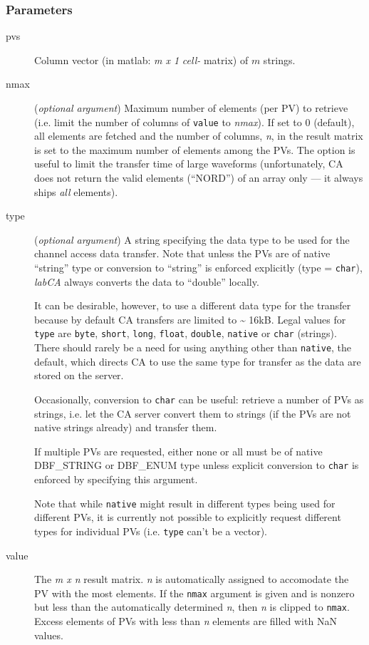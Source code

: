 \documentclass{article}
\newcommand{\sca}{\ita{labCA}}
\newcommand{\com}[1]{{\tt #1}}
\newcommand{\NAN}{\mbox{NaN}}
\newcommand{\ita}[1]{\emph{#1}}
\newcommand{\m}{$m$}
\newcommand{\mhack}{$m$} %
\newcommand{\n}{$n$}
\newcommand{\mxn}{$m\times n$}
\newcommand{\mxl}{$m\times 1$}
\newcommand{\calimit}{$\approx 16$kB}
\renewcommand{\m}{\ita{m}}
\newcommand{\mhack}{\ita{m}} %
\renewcommand{\n}{\ita{n}}
\renewcommand{\mxn}{\ita{m x n}}
\renewcommand{\mxl}{\ita{m x 1}}
\renewcommand{\calimit}{\~{} 16kB}
\newcommand{\PVITEM}{
\item[pvs] Column vector (in matlab: \mxl{} \ita{cell-} matrix)
of \mhack{} strings.
}
\begin{document}
\subsubsection{Parameters}
\begin{description}
\PVITEM
%
%
\item[nmax] \label{nmaxarg}
(\ita{optional argument}) Maximum number of elements
(per PV) to retrieve (i.e. limit the number of columns of \com{value} to
\ita{nmax}).
If set to 0 (default), all elements are fetched
and the number of columns, \n, in the result matrix is set to the
maximum number of elements among the PVs. The option is useful
to limit the transfer time of large waveforms (unfortunately,
CA does not return the valid elements (``NORD'') of
an array only --- it always ships \ita{all} elements).
%
%
\item[type] \label{typearg}
(\ita{optional argument}) A string specifying the
data type to be used for the channel access data transfer. Note
that unless the PVs are of native ``string'' type or conversion to
``string'' is enforced explicitly (type = \com{char}), \sca{}
always converts the data to ``double'' locally.

It can be desirable, however, to use a different data type for the
transfer because by default CA transfers are limited to \calimit.
Legal values for \com{type}{} are \com{byte}, \com{short}, \com{long},
\com{float}, \com{double}, \com{native} or \com{char} (strings).
There should rarely be a need for using anything other than \com{native},
the default, which directs CA to use the same type for transfer as the
data are stored on the server.

Occasionally, conversion to \com{char} can be useful: retrieve a number
of PVs as strings, i.e. let the CA server convert them to strings
(if the PVs are not native strings already) and transfer them.

If multiple PVs are requested, either none or all must be of native
DBF\_STRING or DBF\_ENUM type unless explicit conversion to \com{char}
is enforced by specifying this argument.

Note that while \com{native}{} might result in different types
being used for different PVs, it is currently not possible to
explicitly request different types for individual PVs (i.e.
\com{type}{} can't be a vector).
%
%
\item[value] The \mxn{} result matrix. \n{} is automatically
assigned to accomodate the PV with the most elements. If the \com{nmax}{}
argument is given and is nonzero but less than the automatically
determined \n, then \n{} is clipped to \com{nmax}.
Excess elements of PVs with less than \n{} elements are filled with
\NAN{} values.


\end{description}
\end{document}
